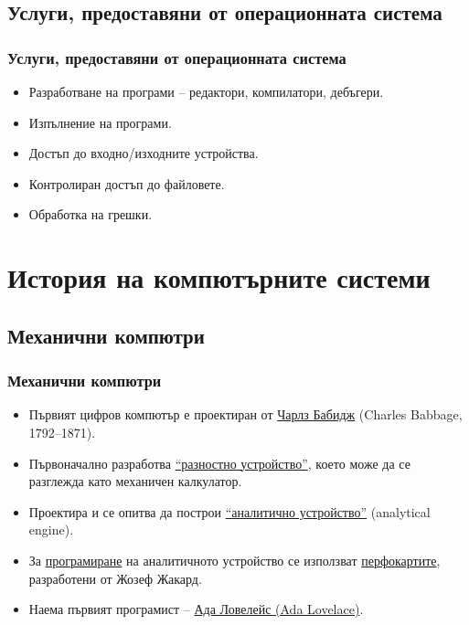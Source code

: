 \documentclass[ignorenonframetext, hyperref=unicode]{beamer}
\begin{document}
\subsection{Услуги, предоставяни от операционната система}

\begin{frame}
\frametitle{Услуги, предоставяни от операционната система}
\begin{itemize}
  \item Разработване на програми -- редактори, компилатори, дебъгери.
  \item Изпълнение на програми.
  \item Достъп до входно/изходните устройства.
  \item Контролиран достъп до файловете.
  \item Обработка на грешки.
\end{itemize}

\end{frame}

\section{История на компютърните системи}

\subsection{Механични компютри}

\begin{frame}
\frametitle{Механични компютри}
\begin{itemize}
  \item Първият цифров компютър е проектиран от 
 	\href{http://en.wikipedia.org/wiki/Charles_Babbage}{Чарлз Бабидж} (Charles
	Babbage, 1792--1871). 
\item Първоначално разработва
 \href{http://en.wikipedia.org/wiki/Difference_engine}{``разностно устройство''}, което може да се
разглежда като механичен калкулатор.
\item Проектира и се опитва да построи 
\href{http://cse.stanford.edu/classes/sophomore-college/projects-98/babbage/ana-mech.htm}{``аналитично устройство''} 
(analytical engine).
\item За 
\href{http://cse.stanford.edu/classes/sophomore-college/projects-98/babbage/ana-prog.htm}{програмиране} 
на аналитичното устройство се използват 
\href{http://en.wikipedia.org/wiki/Jacquard_loom}{перфокартите},
разработени от Жозеф Жакард.
\item Наема първият програмист -- 
\href{http://en.wikipedia.org/wiki/Ada_Lovelace}{Ада Ловелейс (Ada Lovelace)}.
\end{itemize}
\end{frame}
\end{document}
